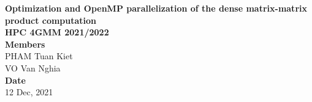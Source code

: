 \onehalfspacing


\vspace*{\fill}
\begin{center}
  \LARGE{\textbf{Optimization and OpenMP parallelization of the dense matrix-matrix product computation}}\\
  \Large{\textbf{HPC 4GMM 2021/2022}}\\
  \vspace*{1\baselineskip}
  \Large{\textbf{Members}}\\
  PHAM Tuan Kiet\\
  VO Van Nghia\\
  \vfill %
  \vspace*{\fill}
  \Large{\textbf{Date}}\\
  12 Dec, 2021
\end{center}

\newpage

\newpage
{}
\tableofcontents
{}

\listoffigures

\newpage
{}
